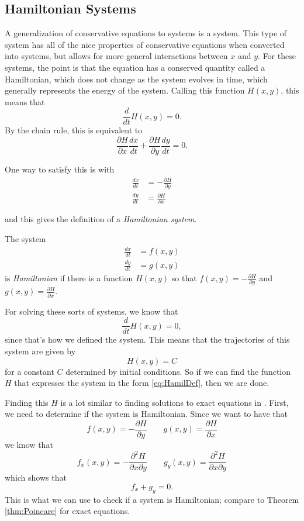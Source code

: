 \subsection{Hamiltonian Systems}

A generalization of conservative equations to systems is a  system. This type of system has all of the nice properties of conservative equations when converted into systems, but allows for more general interactions between $x$ and $y$. For these systems, the point is that the equation has a conserved quantity called a Hamiltonian, which does not change as the system evolves in time, which generally represents the energy of the system. Calling this function $H(x,y)$, this means that
\[ \frac{d}{dt}H(x,y) = 0. \] By the chain rule, this is equivalent to
\[ \frac{\partial H}{\partial x} \frac{dx}{dt} + \frac{\partial H}{\partial y} \frac{dy}{dt} = 0.\]

One way to satisfy this is with 
\begin{equation}
\begin{split}
\frac{dx}{dt} &= -\frac{\partial H}{\partial y} \\
\frac{dy}{dt} &= \frac{\partial H}{\partial x}
\end{split}
\label{eq:HamilDef}
\end{equation} 

and this gives the definition of a \emph{Hamiltonian system}. 

\begin{definition}
The system
\begin{equation}
\begin{split}
\frac{dx}{dt} &=f(x,y) \\
\frac{dy}{dt} &= g(x,y)
\end{split}
\end{equation} 
is \emph{Hamiltonian} if there is a function $H(x,y)$ so that $f(x,y) = -\frac{\partial H}{\partial y}$ and $g(x,y) = \frac{\partial H}{\partial x}$. 
\end{definition}

For solving these sorts of systems, we know that 
\[ \frac{d}{dt}H(x,y) = 0, \]
since that's how we defined the system. This means that the trajectories of this system are given by
\[ H(x,y) = C \] for a constant $C$ determined by initial conditions. So if we can find the function $H$ that expresses the system in the form \eqref{eq:HamilDef}, then we are done.

Finding this $H$ is a lot similar to finding solutions to exact equations in . First, we need to determine if the system is Hamiltonian. Since we want to have that
\[ f(x,y) = -\frac{\partial H}{\partial y} \qquad g(x,y) = \frac{\partial H}{\partial x} \]
we know that
\[ f_x(x,y) = -\frac{\partial^2 H}{\partial x \partial y} \qquad g_y(x,y) = \frac{\partial^2 H}{\partial x \partial y} \] which shows that
\[ f_x + g_y = 0. \] This is what we can use to check if a system is Hamiltonian; compare to Theorem \ref{thm:Poincare} for exact equations.

